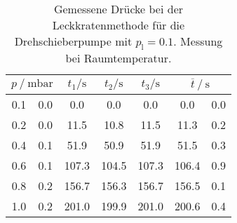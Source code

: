 \begin{table} 
\centering 
\caption{Gemessene Drücke bei der Leckkratenmethode für die Drehschieberpumpe mit $p_{\mathrm{l}}=0.1$. Messung bei Raumtemperatur.} 
\label{tab: leck_dreh_leck_0.1.pdf} 
\begin{tabular}{S[table-format=1.1]@{${}\pm{}$} S[table-format=1.1] S S S S[table-format=1.1]@{${}\pm{}$} S[table-format=1.1] } 
\toprule  
{} & {$t_1 / \si{ \second}$} & {$t_2 / \si{ \second}$} & {$t_3 / \si{ \second}$} &  \\ 
 & 0.0 & 0.0 & 0.0 & 0.0 & 0.0 & 0.0\\ 
0.2 & 0.0 & 11.5 & 10.8 & 11.5 & 11.3 & 0.2\\ 
0.4 & 0.1 & 51.9 & 50.9 & 51.9 & 51.5 & 0.3\\ 
0.6 & 0.1 & 107.3 & 104.5 & 107.3 & 106.4 & 0.9\\ 
0.8 & 0.2 & 156.7 & 156.3 & 156.7 & 156.5 & 0.1\\ 
1.0 & 0.2 & 201.0 & 199.9 & 201.0 & 200.6 & 0.4\\ 
\bottomrule 
\end{tabular} 
\end{table}